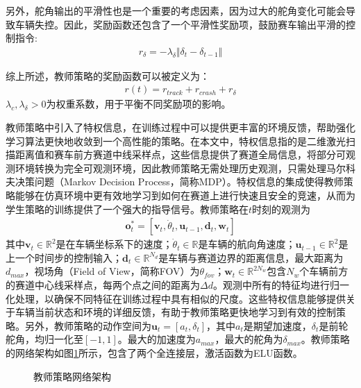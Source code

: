 另外，舵角输出的平滑性也是一个重要的考虑因素，因为过大的舵角变化可能会导致车辆失控。因此，奖励函数还包含了一个平滑性奖励项，鼓励赛车输出平滑的控制指令:
\begin{equation}
\begin{aligned}
r_{\delta}=-\lambda_{\delta}\Vert \delta_t-\delta_{t-1}\Vert
\end{aligned}
\label{equ:smoothness-reward}
\end{equation}

综上所述，教师策略的奖励函数可以被定义为：
\begin{equation}
\begin{aligned}
r(t)=r_{track}+r_{crash}+r_{\delta}
\end{aligned}
\label{equ:reward}
\end{equation}
$\lambda_{c},\lambda_{\delta}>0$为权重系数，用于平衡不同奖励项的影响。

教师策略中引入了特权信息，在训练过程中可以提供更丰富的环境反馈，帮助强化学习算法更快地收敛到一个高性能的策略。在本文中，特权信息指的是二维激光扫描距离值和赛车前方赛道中线采样点，这些信息提供了赛道全局信息，将部分可观测环境转换为完全可观测环境，因此教师策略无需处理历史观测，只需处理马尔科夫决策问题（Markov Decision Process，简称MDP）。特权信息的集成使得教师策略能够在仿真环境中更有效地学习到如何在赛道上进行快速且安全的竞速，从而为学生策略的训练提供了一个强大的指导信号。教师策略在$t$时刻的观测为
\begin{equation}
\begin{aligned}
\boldsymbol{o}^\ast_t=[\boldsymbol{v}_t, \dot{\theta}_t, \boldsymbol{u}_{t-1}, \boldsymbol{d}_t, \boldsymbol{w}_t]
\end{aligned}
\label{equ:teacher-observation}
\end{equation}
其中$\boldsymbol{v}_t\in\mathbb{R}^2$是在车辆坐标系下的速度；$\dot{\theta}_t\in\mathbb{R}$是车辆的航向角速度；$\boldsymbol{u}_{t-1}\in\mathbb{R}^2$是上一个时间步的控制输入；$\boldsymbol{d}_t\in\mathbb{R}^{N_d}$是车辆与赛道边界的距离信息，最大距离为$d_{max}$，视场角（Field of View，简称FOV）为$\theta_{fov}$；$\boldsymbol{w}_t\in\mathbb{R}^{2N_w}$包含$N_w$个车辆前方的赛道中心线采样点，每两个点之间的距离为$\Delta d$。观测中所有的特征均进行归一化处理，以确保不同特征在训练过程中具有相似的尺度。这些特权信息能够提供关于车辆当前状态和环境的详细反馈，有助于教师策略更快地学习到有效的控制策略。另外，教师策略的动作空间为$\boldsymbol{u}_t=[a_t, \delta_t]$，其中$a_t$是期望加速度，$\delta_t$是前轮舵角，均归一化至$[-1,1]$。最大的加速度为$a_{max}$，最大的舵角为$\delta_{max}$。教师策略的网络架构如图\ref{fig:policy-architecture}所示，包含了两个全连接层，激活函数为ELU函数\cite{clevert2015fast}。
\begin{figure}[ht]
    \centering
    
    \caption{教师策略网络架构}
    \label{fig:policy-architecture}
\end{figure}

